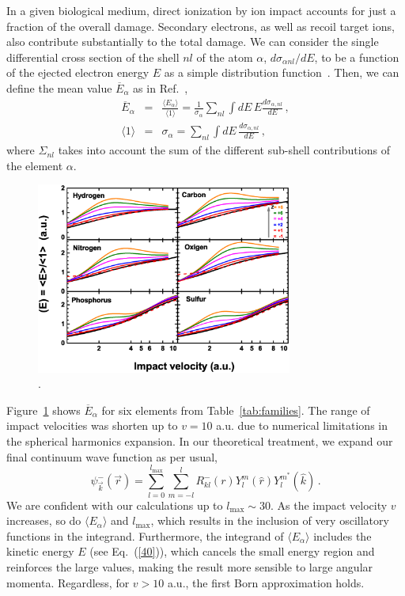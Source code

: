 \documentclass[preprint,12pt]{article}
\begin{document}
In a given biological medium, direct ionization by ion impact accounts 
for just a fraction of the overall damage. Secondary electrons, as well 
as recoil target ions, also contribute substantially to the total damage. 
We can consider the single differential cross section of the shell 
$nl$ of the atom $\alpha$, $d\sigma _{\alpha nl}/dE$, to be a function 
of the ejected electron energy $E$ as a simple distribution 
function~\cite{surdutovic2018}. Then, we can define the mean value 
$\overline{E}_{\alpha}$ as in Ref.~\cite{abril2015},
\begin{eqnarray}
\overline{E}_{\alpha} &=&\frac{\langle E_{\alpha}\rangle}{\langle
1\rangle}=\frac{1}{\sigma_{\alpha}}\sum\limits_{nl}\int dE\,E
\frac{d\sigma_{\alpha,nl}}{dE}\,,  
\label{40} \\
\langle 1\rangle &=&\sigma_{\alpha}=\sum\limits_{nl}\int dE\,
\frac{d\sigma_{\alpha,nl}}{dE}\,,  
\label{50}
\end{eqnarray}
where $\Sigma_{nl}$ takes into account the sum of the different 
sub-shell contributions of the element $\alpha$.

\begin{figure}[t!]
\centering
\includegraphics[width=0.75\textwidth]{figuras/Fig_finales/Fig5.eps}
\caption{.}
\label{fig:emittedener}
\end{figure} 

Figure~\ref{fig:emittedener} shows $\overline{E}_{\alpha}$ for six elements from 
Table~\ref{tab:families}. The range of impact velocities was shorten up 
to $v=10$ a.u. due to numerical limitations in the spherical harmonics 
expansion. In our theoretical treatment, we expand our final continuum 
wave function as per usual,
\begin{equation}
\psi_{\overrightarrow{k}}^{-}(\overrightarrow{r})=\sum_{l=0}^{l_{\max
}}\sum_{m=-l}^{l}R_{kl}^{-}(r)Y_{l}^{m}(\widehat{r})Y_{l}^{m^{\ast }}
(\widehat{k})\,.
\label{60}
\end{equation}
We are confident with our calculations up to $l_{\max}\sim 30$. 
As the impact velocity $v$ increases, so do $\langle E_{\alpha}\rangle$
and $l_{\max}$, which results in the inclusion of very oscillatory 
functions in the integrand. Furthermore, the integrand of
$\langle E_{\alpha}\rangle$ includes the kinetic energy $E$
(see Eq.~(\ref{40})), which cancels the small energy region and 
reinforces the large values, making the result more sensible to large
angular momenta. Regardless, for $v>10$ a.u., the first Born 
approximation holds.
\end{document}

